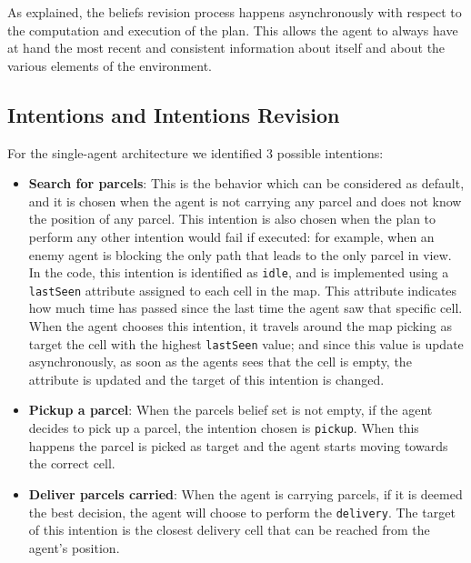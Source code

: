 \documentclass[a4paper, 11pt]{article}
\begin{document}
As explained, the beliefs revision process happens asynchronously with respect to the computation and execution of the plan. This allows the agent to always have at hand the most recent and consistent information about itself and about the various elements of the environment.

\subsection{Intentions and Intentions Revision}
For the single-agent architecture we identified 3 possible intentions:
\begin{itemize}
\item \textbf{Search for parcels}: This is the behavior which can be considered as default, and it is chosen when the agent is not carrying any parcel and does not know the position of any parcel. This intention is also chosen when the plan to perform any other intention would fail if executed: for example, when an enemy agent is blocking the only path that leads to the only parcel in view. In the code, this intention is identified as \verb|idle|, and is implemented using a \verb|lastSeen| attribute assigned to each cell in the map. This attribute indicates how much time has passed since the last time the agent saw that specific cell. When the agent chooses this intention, it travels around the map picking as target the cell with the highest \verb|lastSeen| value; and since this value is update asynchronously, as soon as the agents sees that the cell is empty, the attribute is updated and the target of this intention is changed.
\item \textbf{Pickup a parcel}: When the parcels belief set is not empty, if the agent decides to pick up a parcel, the intention chosen is \verb|pickup|. When this happens the parcel is picked as target and the agent starts moving towards the correct cell.
\item \textbf{Deliver parcels carried}: When the agent is carrying parcels, if it is deemed the best decision, the agent will choose to perform the \verb|delivery|. The target of this intention is the closest delivery cell that can be reached from the agent's position.
\end{itemize}
\end{document}
